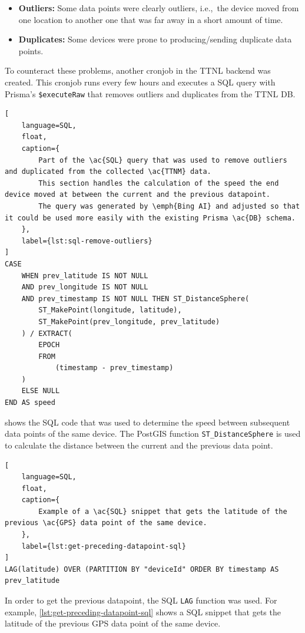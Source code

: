 \begin{itemize}
    \item \textbf{Outliers:} Some data points were clearly outliers, i.e.,\ the device moved from one location to another one that was far away in a short amount of time.
    \item \textbf{Duplicates:} Some devices were prone to producing/sending duplicate data points.
\end{itemize}

To counteract these problems, another cronjob in the \ac{TTNL} backend was created.
This cronjob runs every few hours and executes a \ac{SQL} query with Prisma's \lstinline|$executeRaw| that removes outliers and duplicates from the \ac{TTNL} \ac{DB}.

\begin{lstlisting}[
    language=SQL,
    float,
    caption={
        Part of the \ac{SQL} query that was used to remove outliers and duplicated from the collected \ac{TTNM} data.
        This section handles the calculation of the speed the end device moved at between the current and the previous datapoint.
        The query was generated by \emph{Bing AI} and adjusted so that it could be used more easily with the existing Prisma \ac{DB} schema.
    },
    label={lst:sql-remove-outliers}
]
CASE
    WHEN prev_latitude IS NOT NULL
    AND prev_longitude IS NOT NULL
    AND prev_timestamp IS NOT NULL THEN ST_DistanceSphere(
        ST_MakePoint(longitude, latitude),
        ST_MakePoint(prev_longitude, prev_latitude)
    ) / EXTRACT(
        EPOCH
        FROM
            (timestamp - prev_timestamp)
    )
    ELSE NULL
END AS speed
\end{lstlisting}

 shows the \ac{SQL} code that was used to determine the speed between subsequent data points of the same device.
The PostGIS function \lstinline|ST_DistanceSphere| is used to calculate the distance between the current and the previous data point.

\begin{lstlisting}[
    language=SQL,
    float,
    caption={
        Example of a \ac{SQL} snippet that gets the latitude of the previous \ac{GPS} data point of the same device.
    },
    label={lst:get-preceding-datapoint-sql}
]
LAG(latitude) OVER (PARTITION BY "deviceId" ORDER BY timestamp AS prev_latitude
\end{lstlisting}

In order to get the previous datapoint, the SQL \lstinline|LAG| function was used.
For example, \cref{lst:get-preceding-datapoint-sql} shows a \ac{SQL} snippet that gets the latitude of the previous \ac{GPS} data point of the same device.

